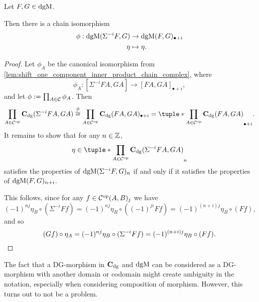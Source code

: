 \begin{lemma}
    \label{lem:dgmod_shift_eq_plus}
    Let \( F, G \in \operatorname{dgM} \).

    Then there is a chain isomorphism
    \begin{align*}
        \phi: \operatorname{dgM}(\Sigma^{-i} F, G) &\to \operatorname{dgM}(F, G)_{\bullet + i} \\
        \eta &\mapsto \eta.
    \end{align*}
\end{lemma}
\begin{proof}
    Let \( \phi_A \) be the canonical isomorphism from \autoref{lem:shift_one_component_inner_product_chain_complex}, where
    \[ 
    \phi_A: [\Sigma^{-i} F A, G A] \to [F A, G A]_{\bullet+i},
    \]
    and let \( \phi := \prod_{A \in {\mathcal{C}}} \phi_A \). Then
    \[
        \prod_{A \in \Cc^{\op}} \C_{\dg}(\Sigma^{-i} F A, G A) \stackrel{\phi}{\cong} \prod_{A \in \Cc^{\op}} \C_{\dg}(F A, G A)_{\bullet+i} = \tuple*{\prod_{A \in \Cc^{\op}} \C_{\dg}(F A, G A)}_{\bullet+i}.
    \]
    It remains to show that for any \( n \in {\mathbb{Z}} \),
    \[
        \eta \in \tuple*{\prod_{A \in \Cc^{\op}} \C_{\dg}(\Sigma^{-i} F A, G A)}_n
    \]
    satisfies the properties of \( \operatorname{dgM}(\Sigma^{-i} F, G)_n \) if and only if it satisfies the properties of \( \operatorname{dgM}(F, G)_{n + i} \).

    This follows, since for any \( f \in {\mathcal{C}}^{\operatorname{op}}(A, B)_j \) we have
    \[
        (-1)^{nj} \eta_B \circ (\Sigma^{-i} F f) = (-1)^{nj} \eta_B \circ ((-1)^{ji}F f) = (-1)^{(n + i)j}\eta_B \circ (F f),
    \]
    and so
    \[
        (G f) \circ \eta_A = (-1)^{nj} \eta_B \circ (\Sigma^{-i} F f) = (-1)^{(n + i)j}\eta_B \circ (F f). \qedhere
    \]
\end{proof}

The fact that a DG-morphism in \( \operatorname{\mathbf{C}}_{\operatorname{dg}} \) and \( \operatorname{dgM} \) can be considered as a DG-morphism with another domain or codomain might create ambiguity in the notation, especially when considering  composition of morphism. However, this turns out to not be a problem.

